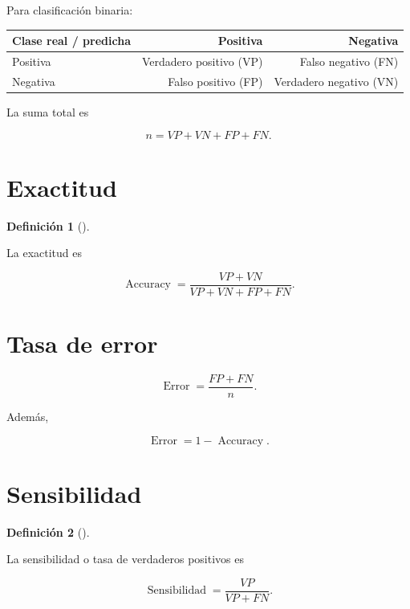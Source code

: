 \documentclass[
  spanish,
  10.5pt,
  letterpaper,
  DIV=11,
  numbers=noendperiod,
  oneside,
  open=any]{scrreprt}
\newcounter{none} %
\theoremstyle{definition}
\newtheorem{definition}{Definición}[chapter]
\theoremstyle{definition}
\theoremstyle{plain}
\theoremstyle{remark}
\begin{document}

Para clasificación binaria:

{\def\LTcaptype{none} %
\begin{longtable}[]{@{}lrr@{}}
\toprule\noalign{}
Clase real / predicha & Positiva & Negativa \\
\midrule\noalign{}
\endhead
\bottomrule\noalign{}
\endlastfoot
Positiva & Verdadero positivo (VP) & Falso negativo (FN) \\
Negativa & Falso positivo (FP) & Verdadero negativo (VN) \\
\end{longtable}
}

La suma total es

\[
n
=
VP+VN+FP+FN.
\]

\section*{Exactitud}\label{exactitud}


\begin{definition}[]\protect\hypertarget{def-exactitud}{}\label{def-exactitud}

La exactitud es

\[
\operatorname{Accuracy}
=
\frac{
VP+VN
}{
VP+VN+FP+FN
}.
\]

\end{definition}

\section*{Tasa de error}\label{tasa-de-error}


\[
\operatorname{Error}
=
\frac{
FP+FN
}{
n
}.
\]

Además,

\[
\operatorname{Error}
=
1-\operatorname{Accuracy}.
\]

\section*{Sensibilidad}\label{sensibilidad}


\begin{definition}[]\protect\hypertarget{def-sensibilidad}{}\label{def-sensibilidad}

La sensibilidad o tasa de verdaderos positivos es

\[
\operatorname{Sensibilidad}
=
\frac{
VP
}{
VP+FN
}.
\]

\end{definition}
\end{document}
